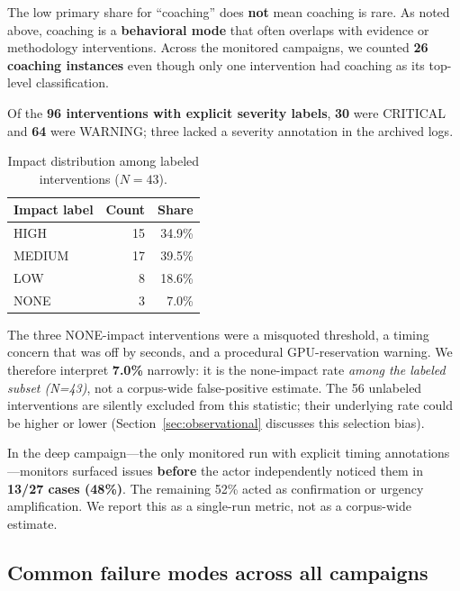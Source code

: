 \documentclass[11pt]{article}
\begin{document}
The low primary share for ``coaching'' does \textbf{not} mean coaching is rare. As noted above, coaching is a \textbf{behavioral mode} that often overlaps with evidence or methodology interventions. Across the monitored campaigns, we counted \textbf{26 coaching instances} even though only one intervention had coaching as its top-level classification.

Of the \textbf{96 interventions with explicit severity labels}, \textbf{30} were CRITICAL and \textbf{64} were WARNING; three lacked a severity annotation in the archived logs.

\begin{table}[h]
\centering
\caption{Impact distribution among labeled interventions ($N=43$).}
\label{tab:impact}
\label{tab:impact-dist}
\small
\begin{tabular}{@{}lrr@{}}
\toprule
\textbf{Impact label} & \textbf{Count} & \textbf{Share} \\
\midrule
HIGH & 15 & 34.9\% \\
MEDIUM & 17 & 39.5\% \\
LOW & 8 & 18.6\% \\
NONE & 3 & 7.0\% \\
\bottomrule
\end{tabular}
\end{table}

The three NONE-impact interventions were a misquoted threshold, a timing concern that was off by seconds, and a procedural GPU-reservation warning. We therefore interpret \textbf{7.0\%} narrowly: it is the none-impact rate \emph{among the labeled subset (N=43)}, not a corpus-wide false-positive estimate. The 56 unlabeled interventions are silently excluded from this statistic; their underlying rate could be higher or lower (Section~\ref{sec:observational} discusses this selection bias).

In the deep campaign---the only monitored run with explicit timing annotations---monitors surfaced issues \textbf{before} the actor independently noticed them in \textbf{13/27 cases (48\%)}. The remaining 52\% acted as confirmation or urgency amplification. We report this as a single-run metric, not as a corpus-wide estimate.

\subsection{Common failure modes across all campaigns}
\end{document}
